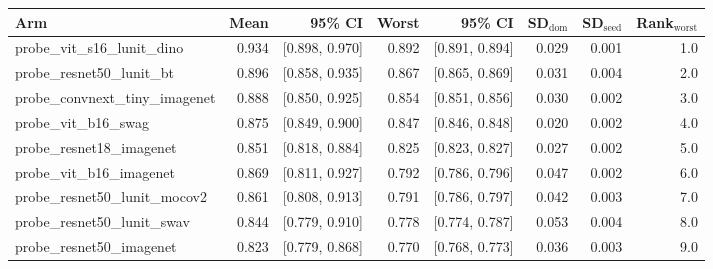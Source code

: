 \begin{tabular}{lrrrrrrr}
\toprule
Arm & Mean & 95\% CI & Worst & 95\% CI & SD$_\text{dom}$ & SD$_\text{seed}$ & Rank$_\text{worst}$ \\
\midrule
probe\_vit\_s16\_lunit\_dino & 0.934 & [0.898, 0.970] & 0.892 & [0.891, 0.894] & 0.029 & 0.001 & 1.0 \\
probe\_resnet50\_lunit\_bt & 0.896 & [0.858, 0.935] & 0.867 & [0.865, 0.869] & 0.031 & 0.004 & 2.0 \\
probe\_convnext\_tiny\_imagenet & 0.888 & [0.850, 0.925] & 0.854 & [0.851, 0.856] & 0.030 & 0.002 & 3.0 \\
probe\_vit\_b16\_swag & 0.875 & [0.849, 0.900] & 0.847 & [0.846, 0.848] & 0.020 & 0.002 & 4.0 \\
probe\_resnet18\_imagenet & 0.851 & [0.818, 0.884] & 0.825 & [0.823, 0.827] & 0.027 & 0.002 & 5.0 \\
probe\_vit\_b16\_imagenet & 0.869 & [0.811, 0.927] & 0.792 & [0.786, 0.796] & 0.047 & 0.002 & 6.0 \\
probe\_resnet50\_lunit\_mocov2 & 0.861 & [0.808, 0.913] & 0.791 & [0.786, 0.797] & 0.042 & 0.003 & 7.0 \\
probe\_resnet50\_lunit\_swav & 0.844 & [0.779, 0.910] & 0.778 & [0.774, 0.787] & 0.053 & 0.004 & 8.0 \\
probe\_resnet50\_imagenet & 0.823 & [0.779, 0.868] & 0.770 & [0.768, 0.773] & 0.036 & 0.003 & 9.0 \\
\bottomrule
\end{tabular}
